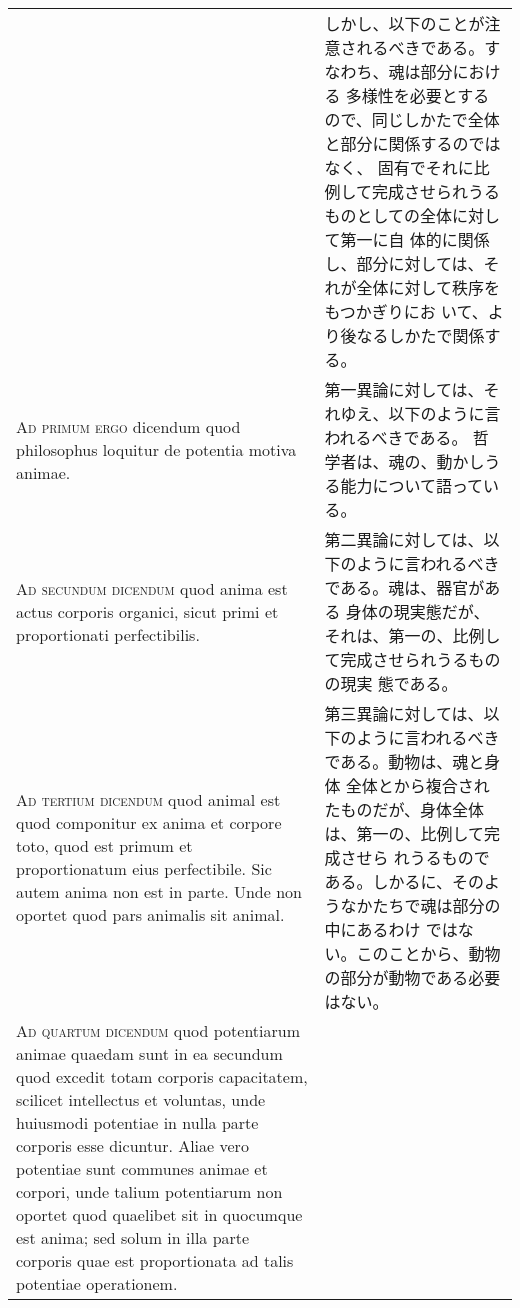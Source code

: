 \documentclass[paper=a4paper,fontsize=10pt,jafontsize=9pt,titlepage]{jlreq}
\begin{document}
\begin{longtable}{p{21em}p{21em}}
 &

 しかし、以下のことが注意されるべきである。すなわち、魂は部分における
 多様性を必要とするので、同じしかたで全体と部分に関係するのではなく、
 固有でそれに比例して完成させられうるものとしての全体に対して第一に自
 体的に関係し、部分に対しては、それが全体に対して秩序をもつかぎりにお
 いて、より後なるしかたで関係する。

\\



 {\scshape Ad primum ergo} dicendum quod philosophus loquitur de
 potentia motiva animae.

 &

 第一異論に対しては、それゆえ、以下のように言われるべきである。
 哲学者は、魂の、動かしうる能力について語っている。
 
\\



 {\scshape Ad secundum dicendum} quod anima est actus corporis
 organici, sicut primi et proportionati perfectibilis.

 &

 第二異論に対しては、以下のように言われるべきである。魂は、器官がある
 身体の現実態だが、それは、第一の、比例して完成させられうるものの現実
 態である。

\\



 {\scshape Ad tertium dicendum} quod animal est quod componitur ex
 anima et corpore toto, quod est primum et proportionatum eius
 perfectibile. Sic autem anima non est in parte. Unde non oportet quod
 pars animalis sit animal.

 &

 第三異論に対しては、以下のように言われるべきである。動物は、魂と身体
 全体とから複合されたものだが、身体全体は、第一の、比例して完成させら
 れうるものである。しかるに、そのようなかたちで魂は部分の中にあるわけ
 ではない。このことから、動物の部分が動物である必要はない。

\\



 {\scshape Ad quartum dicendum} quod potentiarum animae quaedam sunt
 in ea secundum quod excedit totam corporis capacitatem, scilicet
 intellectus et voluntas, unde huiusmodi potentiae in nulla parte
 corporis esse dicuntur. Aliae vero potentiae sunt communes animae et
 corpori, unde talium potentiarum non oportet quod quaelibet sit in
 quocumque est anima; sed solum in illa parte corporis quae est
 proportionata ad talis potentiae operationem.


\end{longtable}
\end{document}
